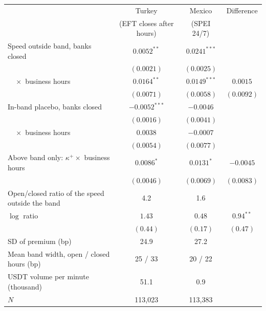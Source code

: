 \begin{tabular}{lccc}
\toprule
 & Turkey & Mexico & Difference \\
 & (EFT closes after hours) & (SPEI 24/7) & \\
\midrule
Speed outside band, banks closed & $0.0052^{**}$ & $0.0241^{***}$ &  \\
 & $(0.0021)$ & $(0.0025)$ &  \\
$\quad\times$ business hours & $0.0164^{**}$ & $0.0149^{***}$ & $0.0015$ \\
 & $(0.0071)$ & $(0.0058)$ & $(0.0092)$ \\
In-band placebo, banks closed & $-0.0052^{***}$ & $-0.0046$ &  \\
 & $(0.0016)$ & $(0.0041)$ &  \\
$\quad\times$ business hours & $0.0038$ & $-0.0007$ &  \\
 & $(0.0054)$ & $(0.0077)$ &  \\
\midrule
Above band only: $\kappa^+\times$ business hours & $0.0086^{*}$ & $0.0131^{*}$ & $-0.0045$ \\
 & $(0.0046)$ & $(0.0069)$ & $(0.0083)$ \\
Open/closed ratio of the speed outside the band & 4.2 & 1.6 & \\
$\log$ ratio & $1.43$ & $0.48$ & $0.94^{**}$ \\
 & $(0.44)$ & $(0.17)$ & $(0.47)$ \\
SD of premium (bp) & 24.9 & 27.2 & \\
Mean band width, open / closed hours (bp) & 25 / 33 & 20 / 22 & \\
USDT volume per minute (thousand) & 51.1 & 0.9 & \\
$N$ & 113,023 & 113,383 & \\
\bottomrule
\end{tabular}
